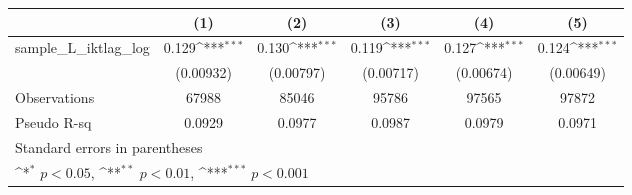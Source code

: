 {
\def\sym#1{\ifmmode^{#1}\else\(^{#1}\)\fi}
\begin{tabular}{l*{5}{c}}
\hline\hline
                &\multicolumn{1}{c}{(1)}         &\multicolumn{1}{c}{(2)}         &\multicolumn{1}{c}{(3)}         &\multicolumn{1}{c}{(4)}         &\multicolumn{1}{c}{(5)}         \\
\hline
sample\_L\_iktlag\_log&    0.129\sym{***}&    0.130\sym{***}&    0.119\sym{***}&    0.127\sym{***}&    0.124\sym{***}\\
                &(0.00932)         &(0.00797)         &(0.00717)         &(0.00674)         &(0.00649)         \\
\hline
Observations    &    67988         &    85046         &    95786         &    97565         &    97872         \\
Pseudo R-sq     &   0.0929         &   0.0977         &   0.0987         &   0.0979         &   0.0971         \\
\hline\hline
\multicolumn{6}{l}{\footnotesize Standard errors in parentheses}\\
\multicolumn{6}{l}{\footnotesize \sym{*} \(p<0.05\), \sym{**} \(p<0.01\), \sym{***} \(p<0.001\)}\\
\end{tabular}
}
